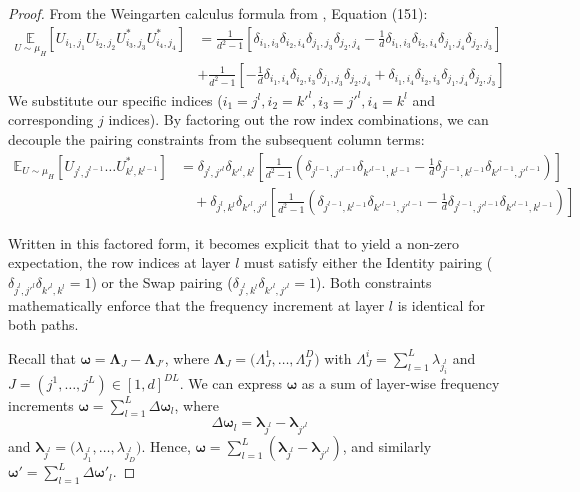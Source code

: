 \documentclass[%
 reprint,
 amsmath,amssymb,
 aps,
 pra,
]{revtex4-2}
\theoremstyle{definition}
\begin{document}
\begin{proof}
From the Weingarten calculus formula from \cite{Mele2024}, Equation (151):
$$
\begin{aligned}
\underset{U \sim \mu_H}{\mathbb{E}}\left[U_{i_1, j_1} U_{i_2, j_2} U_{i_3, j_3}^* U_{i_4, j_4}^*\right] & =\frac{1}{d^2-1}\left[\delta_{i_1, i_3} \delta_{i_2, i_4} \delta_{j_1, j_3} \delta_{j_2, j_4}-\frac{1}{d} \delta_{i_1, i_3} \delta_{i_2, i_4} \delta_{j_1, j_4} \delta_{j_2, j_3}\right] \\
& +\frac{1}{d^2-1}\left[-\frac{1}{d} \delta_{i_1, i_4} \delta_{i_2, i_3} \delta_{j_1, j_3} \delta_{j_2, j_4}+\delta_{i_1, i_4} \delta_{i_2, i_3} \delta_{j_1, j_4} \delta_{j_2, j_3}\right]
\end{aligned}
$$
We substitute our specific indices ($i_1=j^l, i_2=k'^l, i_3=j'^l, i_4=k^l$ and corresponding $j$ indices). By factoring out the row index combinations, we can decouple the pairing constraints from the subsequent column terms:
$$
\begin{aligned}
\mathbb{E}_{U\sim\mu_H} \left[ U_{j^l, j^{l-1}} \dots U_{k^l, k^{l-1}}^* \right]
&= \delta_{j^l, j'^l} \delta_{k'^l, k^l} \left[ \frac{1}{d^2-1} \left( \delta_{j^{l-1}, j'^{l-1}} \delta_{k'^{l-1}, k^{l-1}} - \frac{1}{d} \delta_{j^{l-1}, k^{l-1}} \delta_{k'^{l-1}, j'^{l-1}} \right) \right] \\
&\quad + \delta_{j^l, k^l} \delta_{k'^l, j'^l} \left[ \frac{1}{d^2-1} \left( \delta_{j^{l-1}, k^{l-1}} \delta_{k'^{l-1}, j'^{l-1}} - \frac{1}{d} \delta_{j^{l-1}, j'^{l-1}} \delta_{k'^{l-1}, k^{l-1}} \right) \right]
\end{aligned}
$$

Written in this factored form, it becomes explicit that to yield a non-zero expectation, the row indices at layer $l$ must satisfy either the Identity pairing ($\delta_{j^l, j'^l}\delta_{k'^l, k^l} = 1$) or the Swap pairing ($\delta_{j^l, k^l}\delta_{k'^l, j'^l} = 1$). Both constraints mathematically enforce that the frequency increment at layer $l$ is identical for both paths.

Recall that $\boldsymbol\omega = \boldsymbol\Lambda_J - \boldsymbol\Lambda_{J'}$, where $\boldsymbol\Lambda_J = \bigl(\Lambda_J^1,\dots,\Lambda_J^D\bigr)$ with $\Lambda_J^i = \sum_{l=1}^L\lambda_{j_i^l}$ and $J=(j^1,\dots,j^L)\in[1,d]^{DL}$. We can express $\bm{\omega}$ as a sum of layer-wise frequency increments $\bm{\omega} = \sum_{l=1}^L \Delta \bm{\omega}_l$, where
$$
\Delta \bm{\omega}_l = \boldsymbol\lambda_{j^l} - \boldsymbol\lambda_{j'^l}
$$
and $\boldsymbol\lambda_{j^l} = \bigl(\lambda_{j_1^l},\dots,\lambda_{j_D^l}\bigr)$. Hence, $\bm{\omega} = \sum_{l=1}^L (\bm{\lambda}_{j^l} - \bm{\lambda}_{j'^l})$, and similarly $\bm{\omega'} = \sum_{l=1}^L \Delta \bm{\omega'}_l$.


\end{proof}
\end{document}
